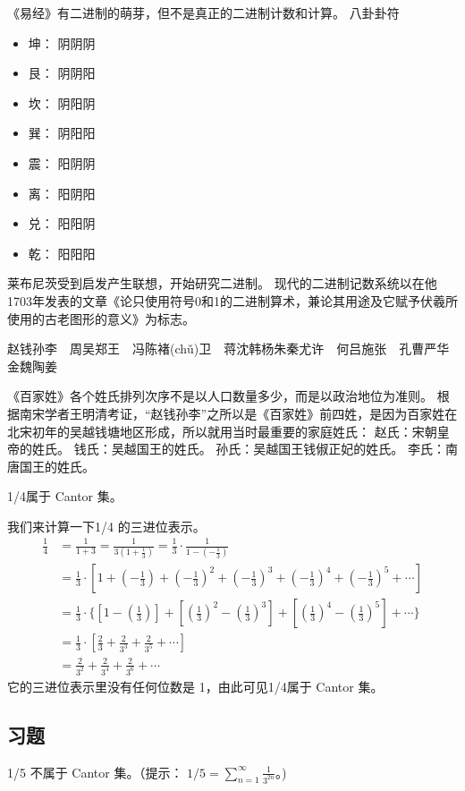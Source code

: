 \documentclass[main.tex]{subfiles}
\begin{document}
《易经》有二进制的萌芽，但不是真正的二进制计数和计算。
八卦卦符
\begin{itemize}
\item 坤： 阴阴阴
\item 艮： 阴阴阳
\item 坎： 阴阳阴
\item 巽： 阴阳阳
\item 震： 阳阴阴
\item 离： 阳阴阳
\item 兑： 阳阳阴
\item 乾： 阳阳阳
\end{itemize}

莱布尼茨受到启发产生联想，开始研究二进制。
现代的二进制记数系统以在他1703年发表的文章《论只使用符号0和1的二进制算术，兼论其用途及它赋予伏羲所使用的古老图形的意义》为标志。



赵钱孙李　周吴郑王　冯陈褚(chǔ)卫　蒋沈韩杨朱秦尤许　何吕施张　孔曹严华　金魏陶姜

《百家姓》各个姓氏排列次序不是以人口数量多少，而是以政治地位为准则。
根据南宋学者王明清考证，“赵钱孙李”之所以是《百家姓》前四姓，是因为百家姓在北宋初年的吴越钱塘地区形成，所以就用当时最重要的家庭姓氏：
赵氏：宋朝皇帝的姓氏。
钱氏：吴越国王的姓氏。
孙氏：吴越国王钱俶正妃的姓氏。
李氏：南唐国王的姓氏。

\begin{example}
	1/4属于 Cantor 集。
\end{example}
我们来计算一下1/4 的三进位表示。
\begin{align*}
\frac{1}{4} &= \frac{1}{1+3} = \frac{1}{3(1+ \frac{1}{3})} 
  = \frac{1}{3} \cdot \frac{1}{1 - (- \frac{1}{3})} \\
  &	= \frac{1}{3} \cdot \left[ 
1 + \left(- \frac{1}{3}\right)
+  \left(- \frac{1}{3}\right)^2 + \left(- \frac{1}{3}\right)^3 
+ \left(- \frac{1}{3}\right)^4   +\left(- \frac{1}{3}\right)^5  +\cdots\right] \\
  &	= \frac{1}{3} \cdot\Big\{ \left[ 
1 - \left( \frac{1}{3}\right)\right]
+ \left[  \left(\frac{1}{3}\right)^2 - \left(\frac{1}{3}\right)^3 \right]
+ \left[ \left(\frac{1}{3}\right)^4   -\left(\frac{1}{3}\right)^5 \right] +\cdots\Big\}\\
  &	= \frac{1}{3} \cdot \left[ 
 \frac{2}{3}+ \frac{2}{3^3}+ \frac{2}{3^5}+\cdots\right] \\
&=  \frac{2}{3^2}+ \frac{2}{3^4}+ \frac{2}{3^6}+\cdots
\end{align*}
\noindent
它的三进位表示里没有任何位数是 1，由此可见1/4属于 Cantor 集。

\subsection*{习题}


	1/5 不属于 Cantor 集。（提示：
	$1/5 = \sum_{n = 1}^\infty\frac{1}{3^{2n}}$。)
\end{document}
